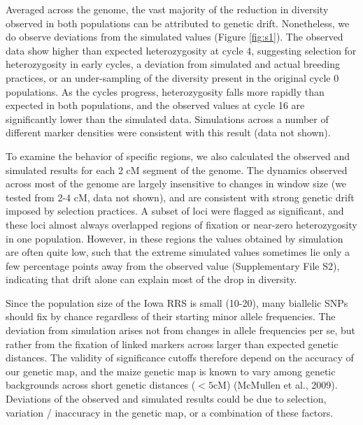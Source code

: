 Averaged across the genome, the vast majority of the reduction in diversity observed in both populations can be attributed to genetic drift. 
Nonetheless, we do observe deviations from the simulated values (Figure \ref{fig:s1}). 
The observed data show higher than expected heterozygosity at cycle 4, suggesting selection for heterozygosity in early cycles, a deviation from simulated and actual breeding practices, or an under-sampling of the diversity present in the original cycle 0 populations. 
As the cycles progress, heterozygosity falls more rapidly than expected in both populations, and the observed values at cycle 16 are significantly lower than the simulated data.  
Simulations across a number of different marker densities were consistent with this result (data not shown). 

To examine the behavior of specific regions, we also calculated the observed and simulated results for each 2 cM segment of the genome. 
The dynamics observed across most of the genome are largely insensitive to changes in window size (we tested from 2-4 cM, data not shown), and are consistent with strong genetic drift imposed by selection practices. 
A subset of loci were flagged as significant, and these loci almost always overlapped regions of fixation or near-zero heterozygosity in one population. 
However, in these regions the values obtained by simulation are often quite low, such that the extreme simulated values sometimes lie only a few percentage points away from the observed value (Supplementary File S2), indicating that drift alone can explain most of the drop in diversity. 

Since the population size of the Iowa RRS is small (10-20), many biallelic SNPs should fix by chance regardless of their starting minor allele frequencies. The deviation from simulation arises not from changes in allele frequencies per se, but rather from the fixation of linked markers across larger than expected genetic distances. 
The validity of significance cutoffs therefore depend on the accuracy of our genetic map, and the maize genetic map is known to vary among genetic backgrounds across short genetic distances ($<5$cM) (McMullen et al., 2009). 
Deviations of the observed and simulated results could be due to selection, variation / inaccuracy in the genetic map, or a combination of these factors. 

